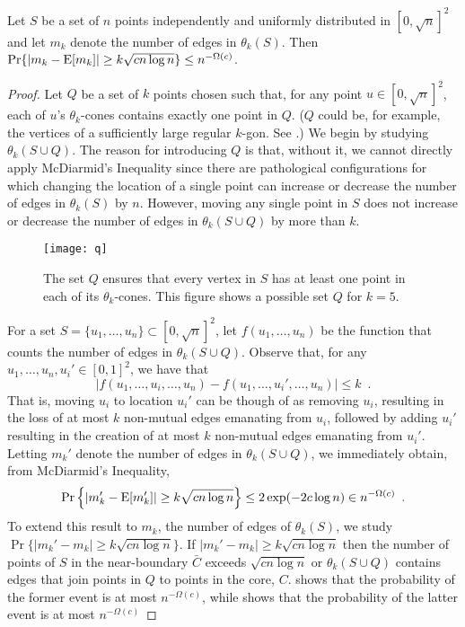 \documentclass{patmorin}
\begin{document}
\begin{lem}
 Let $S$ be a set of $n$ points independently and uniformly distributed
 in $[0,\sqrt{n}]^2$ and let $m_k$ denote the number of edges in $\theta_k(S)$.
 Then $\Pr\{|m_k-\mathrm{E}[m_k]| \ge k\sqrt{cn\log n}\} \le n^{-\Omega(c)}$.
\end{lem}

\begin{proof}
Let $Q$ be a set of $k$ points chosen such that, for any point
$u\in[0,\sqrt{n}]^2$, each of $u$'s $\theta_k$-cones contains
exactly one point in $Q$. ($Q$ could be, for example, the vertices of
a sufficiently large regular $k$-gon. See .)  We begin by
studying $\theta_k(S\cup Q)$. The reason for introducing $Q$ is that,
without it, we cannot directly apply McDiarmid's Inequality since there
are pathological configurations for which changing the location of a
single point can increase or decrease the number of edges in $\theta_k(S)$
by $n$.  However, moving any single point in $S$ does not increase or
decrease the number of edges in $\theta_k(S\cup Q)$ by more than $k$.

\begin{figure}
  \begin{center}
    \texttt{[image: q]}
  \end{center}
  \caption{The set $Q$ ensures that every vertex in $S$ has at least
    one point in each of its $\theta_k$-cones.  This figure shows a
    possible set $Q$ for $k=5$.}
\end{figure}

For a set $S=\{u_1,\ldots,u_n\}\subset [0,\sqrt{n}]^2$, let
$f(u_1,\ldots,u_n)$ be the function that counts the number of edges
in $\theta_k(S\cup Q)$.  Observe that, for any $u_1,\ldots,u_n,u_i'\in
[0,1]^2$, we have that
\[
   |f(u_1,\ldots,u_i,\ldots,u_n)-f(u_1,\ldots,u_i',\ldots,u_n)| \le k \enspace .
\]
That is, moving $u_i$ to location $u_i'$ can be though of as removing
$u_i$, resulting in the loss of at most $k$ non-mutual edges emanating
from $u_i$, followed by adding $u_i'$ resulting in the creation of at
most $k$ non-mutual edges emanating from $u_i'$.  Letting $m_k'$ denote
the number of edges in $\theta_k(S\cup Q)$, we immediately obtain,
from McDiarmid's Inequality,
\[
   \Pr\left\{\left|m_k'-\mathrm{E}[m_k']\right| \ge k\sqrt{cn\log n}\right\} 
       \le 2\exp(-2c\log n) 
       \in n^{-\Omega(c)} \enspace .
\]
To extend this result to $m_k$, the number of edges of $\theta_k(S)$,
we study $\Pr\{|m_k' - m_k|\ge k\sqrt{cn\log n}\}$.  If $|m_k' - m_k|\ge
k\sqrt{cn\log n}$ then the number of points of $S$ in the near-boundary
$\bar{C}$ exceeds $\sqrt{cn\log n}$ or $\theta_k(S\cup Q)$ contains
edges that join points in $Q$ to points in the core, $C$.
 shows that the probability of the former event is at most
$n^{-\Omega(c)}$, while  shows that the probability of
the latter event is at most $n^{-\Omega(c)}$
\end{proof}
\end{document}
